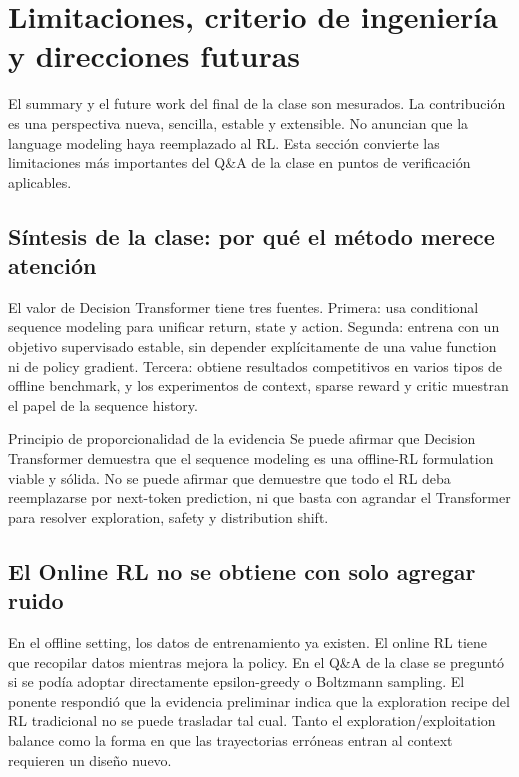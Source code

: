 \section{Limitaciones, criterio de ingeniería y direcciones futuras}

El summary y el future work del final de la clase son mesurados. La contribución es una perspectiva nueva, sencilla, estable y extensible. No anuncian que la language modeling haya reemplazado al RL. Esta sección convierte las limitaciones más importantes del Q\&A de la clase en puntos de verificación aplicables.

\subsection{Síntesis de la clase: por qué el método merece atención}

El valor de Decision Transformer tiene tres fuentes. Primera: usa conditional sequence modeling para unificar return, state y action. Segunda: entrena con un objetivo supervisado estable, sin depender explícitamente de una value function ni de policy gradient. Tercera: obtiene resultados competitivos en varios tipos de offline benchmark, y los experimentos de context, sparse reward y critic muestran el papel de la sequence history.


\begin{importantbox}{Principio de proporcionalidad de la evidencia}
Se puede afirmar que Decision Transformer demuestra que el sequence modeling es una offline-RL formulation viable y sólida. No se puede afirmar que demuestre que todo el RL deba reemplazarse por next-token prediction, ni que basta con agrandar el Transformer para resolver exploration, safety y distribution shift.
\end{importantbox}

\subsection{El Online RL no se obtiene con solo agregar ruido}

En el offline setting, los datos de entrenamiento ya existen. El online RL tiene que recopilar datos mientras mejora la policy. En el Q\&A de la clase se preguntó si se podía adoptar directamente epsilon-greedy o Boltzmann sampling. El ponente respondió que la evidencia preliminar indica que la exploration recipe del RL tradicional no se puede trasladar tal cual. Tanto el exploration/exploitation balance como la forma en que las trayectorias erróneas entran al context requieren un diseño nuevo.

